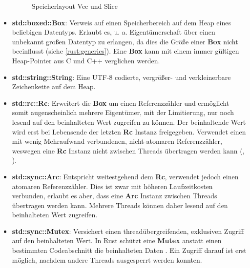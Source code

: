 \begin{itemize}
\begin{figure}[H]
		\caption{Speicherlayout Vec und Slice \cite[63]{rust:orly_programming}}
		\label{rust:memory_layout:vec_slice}
	\end{figure}
	
	\item \textbf{std::boxed::Box}:
	Verweis auf einen Speicherbereich auf dem Heap eines beliebigen Datentyps.
	Erlaubt es, u. a. Eigentümerschaft über einen unbekannt großen Datentyp zu erlangen, da dies die Größe einer \textbf{Box} nicht beeinflusst (siehe \autoref{rust:generics}).
	Eine \textbf{Box} kann mit einem immer gültigen Heap-Pointer aus C und C++ verglichen werden.
	
	\item \textbf{std::string::String}: Eine UTF-8 codierte, vergrößer- und verkleinerbare Zeichenkette auf dem Heap.
	
	\item \textbf{std::rc::Rc}: Erweitert die \textbf{Box} um einen Referenzzähler und ermöglicht somit augenscheinlich mehrere Eigentümer, mit der Limitierung, nur noch lesend auf den beinhalteten Wert zugreifen zu können.
	Der beinhaltende Wert wird erst bei Lebensende der letzten \textbf{Rc} Instanz freigegeben.
	Verwendet einen mit wenig Mehraufwand verbundenen, nicht-atomaren Referenzzähler, weswegen eine \textbf{Rc} Instanz nicht zwischen Threads übertragen werden kann (, ).
	
	\item \textbf{std::sync::Arc}: Entspricht weitestgehend dem \textbf{Rc}, verwendet jedoch einen atomaren Referenzzähler.
	Dies ist zwar mit höheren Laufzeitkosten verbunden, erlaubt es aber, dass eine \textbf{Arc} Instanz zwischen Threads übertragen werden kann.
	Mehrere Threads können daher lesend auf den beinhalteten Wert zugreifen.
	
	\item \textbf{std::sync::Mutex}: Versichert einen threadübergreifenden, exklusiven Zugriff auf den beinhalteten Wert.
	In Rust schützt eine \textbf{Mutex} anstatt einen bestimmten Codeabschnitt die beinhalteten Daten \cite[486]{rust:orly_programming}.
	Ein Zugriff darauf ist erst möglich, nachdem andere Threads ausgesperrt werden konnten.
	

\end{itemize}
